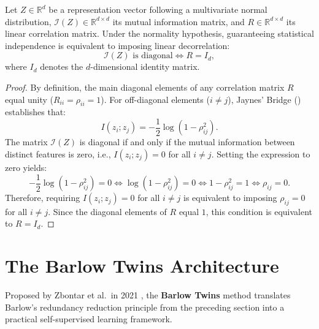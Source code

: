 \documentclass[11pt, oneside, openany]{book}
\begin{document}
\begin{corollary}
\label{cor:5.1}
Let $Z \in \mathbb{R}^{d}$ be a representation vector following a multivariate normal distribution, $\mathcal{I}(Z) \in \mathbb{R}^{d \times d}$ its mutual information matrix, and $R \in \mathbb{R}^{d \times d}$ its linear correlation matrix. Under the normality hypothesis, guaranteeing statistical independence is equivalent to imposing linear decorrelation:
\begin{equation}
\label{eq:5.13}
\mathcal{I}(Z) \text{ is diagonal} \iff R = I_{d},
\end{equation}
where $I_{d}$ denotes the $d$-dimensional identity matrix.
\end{corollary}

\begin{proof}
By definition, the main diagonal elements of any correlation matrix $R$ equal unity ($R_{ii} = \rho_{ii} = 1$). For off-diagonal elements ($i \neq j$), Jaynes' Bridge () establishes that:
\begin{equation}
\label{eq:5.14}
I(z_{i}; z_{j}) = -\frac{1}{2}\log\left(1 - \rho_{ij}^{2}\right).
\end{equation}
The matrix $\mathcal{I}(Z)$ is diagonal if and only if the mutual information between distinct features is zero, i.e., $I(z_{i}; z_{j}) = 0$ for all $i \neq j$. Setting the expression to zero yields:
\begin{equation}
\label{eq:5.15}
-\frac{1}{2}\log\left(1 - \rho_{ij}^{2}\right) = 0 \iff \log\left(1 - \rho_{ij}^{2}\right) = 0 \iff 1 - \rho_{ij}^{2} = 1 \iff \rho_{ij} = 0.
\end{equation}
Therefore, requiring $I(z_{i}; z_{j}) = 0$ for all $i \neq j$ is equivalent to imposing $\rho_{ij} = 0$ for all $i \neq j$. Since the diagonal elements of $R$ equal $1$, this condition is equivalent to $R = I_{d}$.
\end{proof}

\section{The Barlow Twins Architecture}
\label{sec:5.2}

Proposed by Zbontar et al.\ in 2021 \cite{zbontar2021barlow}, the \textbf{Barlow Twins} method translates Barlow's redundancy reduction principle from the preceding section into a practical self-supervised learning framework.
\end{document}
